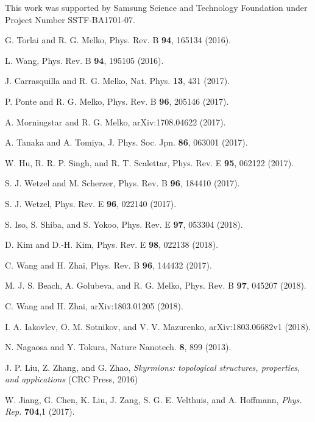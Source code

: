 \documentclass[reprint,amsmath,amssymb,aps,showpacs,superscriptaddress,prl]{revtex4-1}
\begin{document}
This work was supported by Samsung Science and Technology Foundation under Project Number SSTF-BA1701-07.

\begin{thebibliography}{99}

 G. Torlai and R. G. Melko, Phys. Rev. B {\bf 94}, 165134 (2016).

 L. Wang, Phys. Rev. B {\bf 94}, 195105 (2016).

 J. Carrasquilla and R. G. Melko, Nat. Phys. {\bf 13}, 431 (2017).

 P. Ponte and R. G. Melko, Phys. Rev. B {\bf 96}, 205146 (2017).

 A. Morningstar and R. G. Melko, arXiv:1708.04622 (2017).

 A. Tanaka and A. Tomiya, J. Phys. Soc. Jpn. {\bf 86}, 063001 (2017).

 W. Hu, R. R. P. Singh, and R. T. Scalettar, Phys. Rev. E {\bf 95}, 062122 (2017).

 S. J. Wetzel and M. Scherzer, Phys. Rev. B {\bf 96}, 184410 (2017).

 S. J. Wetzel, Phys. Rev. E {\bf 96}, 022140 (2017).

 S. Iso, S. Shiba, and S. Yokoo, Phys. Rev. E {\bf 97}, 053304 (2018).

 D. Kim and D.-H. Kim, Phys. Rev. E {\bf 98}, 022138 (2018).

 C. Wang and H. Zhai, Phys. Rev. B {\bf 96}, 144432 (2017).

 M. J. S. Beach, A. Golubeva, and R. G. Melko, Phys. Rev. B {\bf 97}, 045207 (2018).

 C. Wang and H. Zhai, arXiv:1803.01205 (2018).

 I. A. Iakovlev, O. M. Sotnikov, and V. V. Mazurenko, arXiv:1803.06682v1 (2018).


 N. Nagaosa and Y. Tokura, Nature Nanotech. {\bf 8}, 899 (2013).

 J. P. Liu, Z. Zhang, and G. Zhao, {\it Skyrmions: topological structures, properties, and applications} (CRC Press, 2016)

 W. Jiang, G. Chen, K. Liu, J. Zang, S. G. E. Velthuis, and A. Hoffmann, {\it Phys. Rep.} {\bf 704},1 (2017).


\end{thebibliography}
\end{document}
